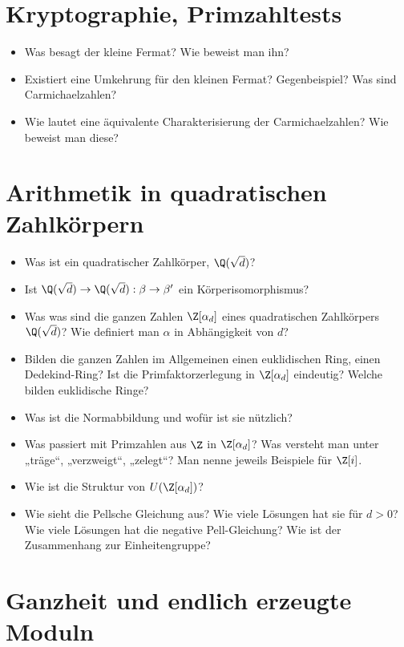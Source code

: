 \documentclass{scrartcl}
\begin{document}
\section{Kryptographie, Primzahltests}

\begin{itemize}
	\item
		Was besagt der kleine Fermat?
		Wie beweist man ihn?
	\item
		Existiert eine Umkehrung für den kleinen Fermat?
		Gegenbeispiel?
		Was sind Carmichaelzahlen?
	\item
		Wie lautet eine äquivalente Charakterisierung der Carmichaelzahlen?
		Wie beweist man diese?
\end{itemize}

\section{Arithmetik in quadratischen Zahlkörpern}

\begin{itemize}
	\item
		Was ist ein quadratischer Zahlkörper, $\Q(\sqrt d)$?
	\item
		Ist $\Q(\sqrt d) \to \Q(\sqrt d) : \beta \to \beta'$ ein Körperisomorphismus?
	\item
		Was was sind die ganzen Zahlen $\Z[\alpha_d]$ eines quadratischen Zahlkörpers $\Q(\sqrt d)$?
		Wie definiert man $\alpha$ in Abhängigkeit von $d$?
	\item
		Bilden die ganzen Zahlen im Allgemeinen einen euklidischen Ring, einen Dedekind-Ring?
		Ist die Primfaktorzerlegung in $\Z[\alpha_d]$ eindeutig?
		Welche bilden euklidische Ringe?
	\item
		Was ist die Normabbildung und wofür ist sie nützlich?
	\item
		Was passiert mit Primzahlen aus $\Z$ in $\Z[\alpha_d]$?
		Was versteht man unter „träge“, „verzweigt“, „zelegt“?
		Man nenne jeweils Beispiele für $\Z[i]$.
	\item
		Wie ist die Struktur von $U(\Z[\alpha_d])$?
	\item
		Wie sieht die Pellsche Gleichung aus?
		Wie viele Lösungen hat sie für $d > 0$?
		Wie viele Lösungen hat die negative Pell-Gleichung?
		Wie ist der Zusammenhang zur Einheitengruppe?
\end{itemize}

\section{Ganzheit und endlich erzeugte Moduln}
\end{document}
